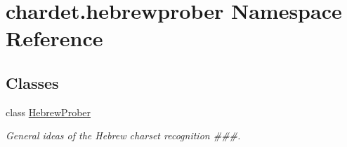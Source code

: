 \hypertarget{namespacechardet_1_1hebrewprober}{}\section{chardet.\+hebrewprober Namespace Reference}
\label{namespacechardet_1_1hebrewprober}
\subsection*{Classes}
\begin{DoxyCompactItemize}
\item 
class \hyperlink{classchardet_1_1hebrewprober_1_1_hebrew_prober}{Hebrew\+Prober}
\begin{DoxyCompactList}\small\item\em General ideas of the Hebrew charset recognition \#\#\#. \end{DoxyCompactList}\end{DoxyCompactItemize}
